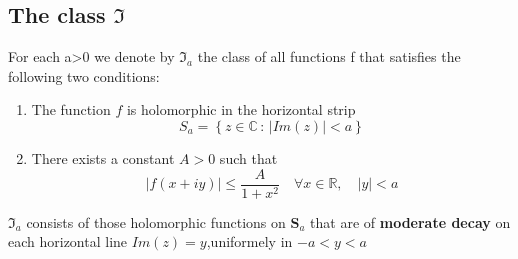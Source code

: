 \documentclass[11pt]{article}
\providecommand{\tightlist}{%
      \setlength{\itemsep}{0pt}\setlength{\parskip}{0pt}}
\begin{document}
    \subsection{\texorpdfstring{The class
\(\Im\)}{The class \textbackslash Im}}\label{the-class-im}

For each a\textgreater0 we denote by \(\Im_{a}\) the class of all
functions f that satisfies the following two conditions:

\begin{enumerate}
\def\labelenumi{\arabic{enumi})}
\tightlist
\item
  The function \(f\) is holomorphic in the horizontal strip
  \[S_{a}=\left\{z\in\mathbb{C}\,:\,|Im(z)| < a\right\}\]
\item
  There exists a constant \(A>0\) such that
  \[|f(x+iy)|\le\dfrac{A}{1+x^{2}}\quad \forall x\in\mathbb{R},\quad |y|<a\]
\end{enumerate}

\(\Im_{a}\) consists of those holomorphic functions on
\(\mathbf{S}_{a}\) that are of \textbf{moderate decay} on each
horizontal line \(Im(z)=y\),uniformely in \(-a<y<a\)
\end{document}
